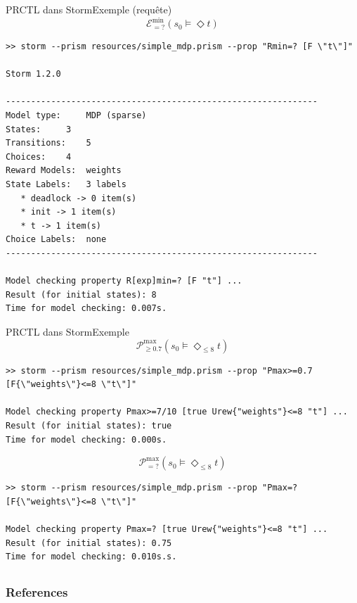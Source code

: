 \documentclass[compress]{beamer}
\begin{document}
\begin{frame}[fragile]{PRCTL dans Storm}{Exemple (requête)}
\vspace{-0.05\linewidth}
  \[
    \mathcal{E}_{=?}^{\min}(s_0 \models \Diamond t)
  \]
  {\tiny
  \begin{verbatim}
>> storm --prism resources/simple_mdp.prism --prop "Rmin=? [F \"t\"]"

Storm 1.2.0

--------------------------------------------------------------
Model type: 	MDP (sparse)
States: 	3
Transitions: 	5
Choices: 	4
Reward Models:  weights
State Labels: 	3 labels
   * deadlock -> 0 item(s)
   * init -> 1 item(s)
   * t -> 1 item(s)
Choice Labels: 	none
--------------------------------------------------------------

Model checking property R[exp]min=? [F "t"] ...
Result (for initial states): 8
Time for model checking: 0.007s.
  \end{verbatim}
  }
\end{frame}

\begin{frame}[fragile]{PRCTL dans Storm}{Exemple}
\vspace{-0.05\linewidth}
  \[
    \mathcal{P}_{\geq 0.7}^{\max}(s_0 \models \Diamond_{\leq 8} t)
  \]
  {\tiny
  \begin{verbatim}
>> storm --prism resources/simple_mdp.prism --prop "Pmax>=0.7 [F{\"weights\"}<=8 \"t\"]"

Model checking property Pmax>=7/10 [true Urew{"weights"}<=8 "t"] ...
Result (for initial states): true
Time for model checking: 0.000s.
  \end{verbatim}
  }
  \[
    \mathcal{P}_{=?}^{\max}(s_0 \models \Diamond_{\leq 8} t)
  \]
  {\tiny
  \begin{verbatim}
>> storm --prism resources/simple_mdp.prism --prop "Pmax=? [F{\"weights\"}<=8 \"t\"]"

Model checking property Pmax=? [true Urew{"weights"}<=8 "t"] ...
Result (for initial states): 0.75
Time for model checking: 0.010s.s.
  \end{verbatim}
  }
\end{frame}

\subsection{}
\begin{frame}[allowframebreaks]
        \frametitle{References}
      \printbibliography
\end{frame}
\end{document}
